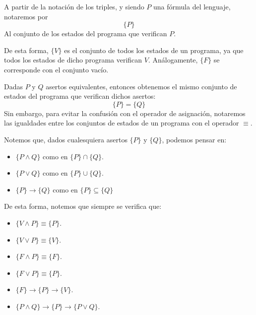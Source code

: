 \begin{notacion}
    A partir de la notación de los triples, y siendo $P$ una fórmula del lenguaje, notaremos por
    \begin{equation*}
        \{P\}
    \end{equation*}
    Al conjunto de los estados del programa que verifican $P$.
\end{notacion}

De esta forma, $\{V\}$ es el conjunto de todos los estados de un programa, ya que todos los estados de dicho programa verifican $V$. Análogamente, $\{F\}$ se corresponde con el conjunto vacío.

\begin{notacion}
    Dadas $P$ y $Q$ asertos equivalentes, entonces obtenemos el mismo conjunto de estados del programa que verifican dichos asertos:
    \begin{equation*}
        \{P\} = \{Q\}
    \end{equation*}
    Sin embargo, para evitar la confusión con el operador de asignación, notaremos las igualdades entre los conjuntos de estados de un programa con el operador $\equiv$.
\end{notacion}

\begin{observacion}
    Notemos que, dados cualesquiera asertos $\{P\}$ y $\{Q\}$, podemos pensar en:
    \begin{itemize}
        \item $\{P \land Q\}$ como en  $\{P\} \cap \{Q\}$.
        \item $\{P \lor Q\}$ como en $\{P\} \cup \{Q\}$.
        \item $\{P\} \rightarrow \{Q\}$ como en $\{P\} \subseteq \{Q\}$
    \end{itemize}
    De esta forma, notemos que siempre se verifica que:
    \begin{itemize}
        \item $\{V \land P\} \equiv \{P\}$.
        \item $\{V \lor P\} \equiv \{V\}$.
        \item $\{F \land P\} \equiv \{F\}$.
        \item $\{F \lor P\} \equiv \{P\}$.
        \item $\{F\}\rightarrow \{P\} \rightarrow \{V\}$.
        \item $\{P \land Q\}\rightarrow \{P\} \rightarrow\{P \lor Q\}$.
    \end{itemize}
\end{observacion}

